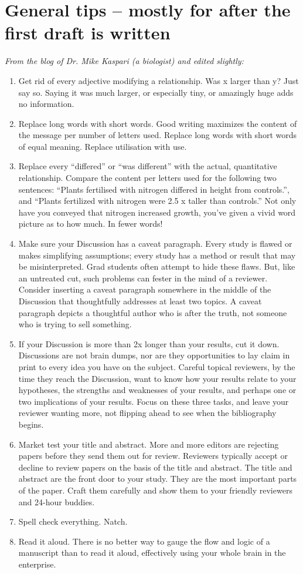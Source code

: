 \section{General tips -- mostly for after the first draft is written}
\textit{From the blog of Dr. Mike Kaspari (a biologist) and edited slightly:}
\begin{enumerate}
\item Get rid of every adjective modifying a relationship. Was x larger than y? Just say so. Saying it was much larger, or especially tiny, or amazingly huge adds no information.
\item Replace long words with short words. Good writing maximizes the content of the message per number of letters used. Replace long words with short words of equal meaning. Replace utilisation with use.
\item Replace every ``differed'' or ``was different'' with the actual, quantitative relationship. Compare the content per letters used for the following two sentences: ``Plants fertilised with nitrogen differed in height from controls.'', and ``Plants fertilized with nitrogen were 2.5 x taller than controls.'' Not only have you conveyed that nitrogen increased growth, you’ve given a vivid word picture as to how much. In fewer words!
\item Make sure your Discussion has a caveat paragraph. Every study is flawed or makes simplifying assumptions; every study has a method or result that may be misinterpreted. Grad students often attempt to hide these flaws. But, like an untreated cut, such problems can fester in the mind of a reviewer. Consider inserting a caveat paragraph somewhere in the middle of the Discussion that thoughtfully addresses at least two topics. A caveat paragraph depicts a thoughtful author who is after the truth, not someone who is trying to sell something.
\item If your Discussion is more than 2x longer than your results, cut it down. Discussions are not brain dumps, nor are they opportunities to lay claim in print to every idea you have on the subject. Careful topical reviewers, by the time they reach the Discussion, want to know how your results relate to your hypotheses, the strengths and weaknesses of your results, and perhaps one or two implications of your results. Focus on these three tasks, and leave your reviewer wanting more, not flipping ahead to see when the bibliography begins.
\item Market test your title and abstract. More and more editors are rejecting papers before they send them out for review. Reviewers typically accept or decline to review papers on the basis of the title and abstract. The title and abstract are the front door to your study. They are the most important parts of the paper. Craft them carefully and show them to your friendly reviewers and 24-hour buddies.
\item Spell check everything. Natch.
\item Read it aloud. There is no better way to gauge the flow and logic of a manuscript than to read it aloud, effectively using your whole brain in the enterprise. 
\end{enumerate}



